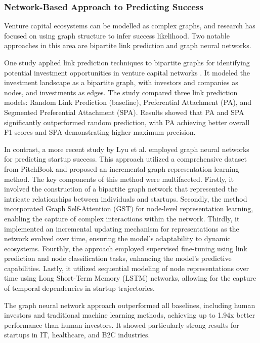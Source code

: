 \documentclass[a4paper, oneside]{discothesis}
\begin{document}
\subsubsection{Network-Based Approach to Predicting Success}

Venture capital ecosystems can be modelled as complex graphs, and research has focused on using graph structure to infer success likelihood. Two notable approaches in this area are bipartite link prediction and graph neural networks.

One study applied link prediction techniques to bipartite graphs for identifying potential investment opportunities in venture capital networks \cite{predictVCbipartite}. It modeled the investment landscape as a bipartite graph, with investors and companies as nodes, and investments as edges. The study compared three link prediction models: Random Link Prediction (baseline), Preferential Attachment (PA), and Segmented Preferential Attachment (SPA). Results showed that PA and SPA significantly outperformed random prediction, with PA achieving better overall F1 scores and SPA demonstrating higher maximum precision.

In contrast, a more recent study by Lyu et al. \cite{lyu2023graph} employed graph neural networks for predicting startup success. This approach utilized a comprehensive dataset from PitchBook and proposed an incremental graph representation learning method. The key components of this method were multifaceted. Firstly, it involved the construction of a bipartite graph network that represented the intricate relationships between individuals and startups. Secondly, the method incorporated Graph Self-Attention (GST) for node-level representation learning, enabling the capture of complex interactions within the network. Thirdly, it implemented an incremental updating mechanism for representations as the network evolved over time, ensuring the model's adaptability to dynamic ecosystems. Fourthly, the approach employed supervised fine-tuning using link prediction and node classification tasks, enhancing the model's predictive capabilities. Lastly, it utilized sequential modeling of node representations over time using Long Short-Term Memory (LSTM) networks, allowing for the capture of temporal dependencies in startup trajectories.

The graph neural network approach outperformed all baselines, including human investors and traditional machine learning methods, achieving up to 1.94x better performance than human investors. It showed particularly strong results for startups in IT, healthcare, and B2C industries.
\end{document}
